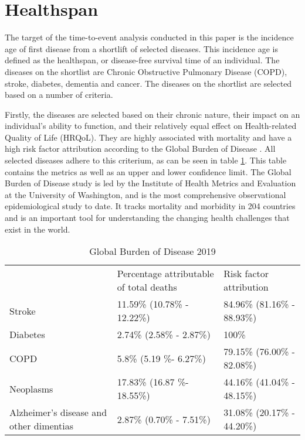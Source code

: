 \section{Healthspan}
\label{section:data:healthspan_target} %
The target of the time-to-event analysis conducted in this paper is the incidence age of first disease from a shortlift of selected diseases. This incidence age is defined as the healthspan, or disease-free survival time of an individual. The diseases on the shortlist are Chronic Obstructive Pulmonary Disease (COPD), stroke, diabetes, dementia and cancer. The diseases on the shortlist are selected based on a number of criteria. 

Firstly, the diseases are selected based on their chronic nature, their impact on an individual's ability to function, and their relatively equal effect on Health-related Quality of Life (HRQoL).  They are highly associated with mortality and have a high risk factor attribution according to the Global Burden of Disease \citep{GBD}. All selected diseases adhere to this criterium, as can be seen in table \ref{table:data:global_burden_of_disease}. This table contains the metrics as well as an upper and lower confidence limit. The Global Burden of Disease study is led by the Institute of Health Metrics and Evaluation at the University of Washington, and is the most comprehensive observational epidemiological study to date. It tracks mortality and morbidity in 204 countries and is an important tool for understanding the changing health challenges that exist in the world.
\vspace{0.5cm}
\begin{table}[H]
    \centering
    \caption{Global Burden of Disease 2019}
    \begin{tabular}{lll}
    \cline{1-3}
             & Percentage attributable of total deaths & Risk factor attribution     \\ \cline{1-3}
    Stroke   & 11.59\% (10.78\% - 12.22\%)             & 84.96\% (81.16\% - 88.93\%) \\
    Diabetes & 2.74\% (2.58\% - 2.87\%)                & 100\%                       \\
    COPD     & 5.8\% (5.19 \%- 6.27\%)                 & 79.15\% (76.00\% - 82.08\%) \\
    Neoplasms     & 17.83\% (16.87 \%- 18.55\%)                 & 44.16\% (41.04\% - 48.15\%) \\
    Alzheimer's disease and other dimentias & 2.87\% (0.70\% - 7.51\%)               & 31.08\% (20.17\% - 44.20\%) 
    \end{tabular}
    \label{table:data:global_burden_of_disease}
\end{table}
